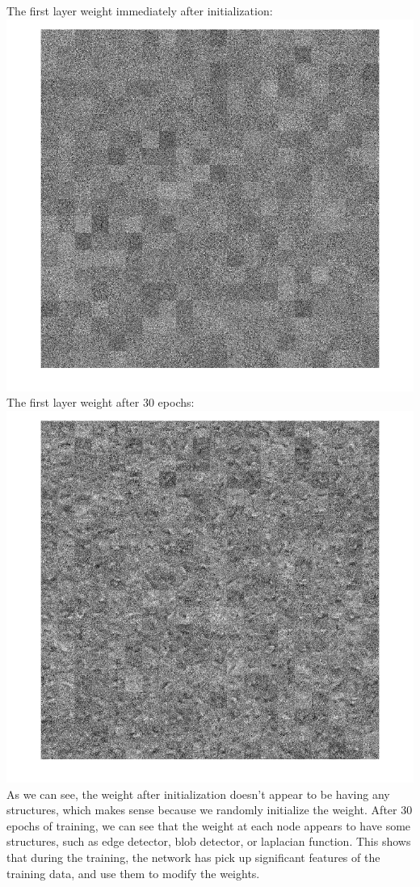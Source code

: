 \documentclass[12pt,letterpaper,boxed]{hmcpset}
\begin{document}
\begin{solution}
The first layer weight immediately after initialization:\\
\includegraphics[width=\textwidth]{3_1_3_1.png}\\
\newpage
The first layer weight after 30 epochs:\\
\includegraphics[width=\textwidth]{3_1_3_2.png}\\
As we can see, the weight after initialization doesn't appear to be having any structures, which makes sense
because we randomly initialize the weight. After 30 epochs of training, we can see that the weight at each node
appears to have some structures, such as edge detector, blob detector, or laplacian function. This shows that
during the training, the network has pick up significant features of the training data, and use them to modify
the weights. 
\end{solution}
\newpage
\end{document}
